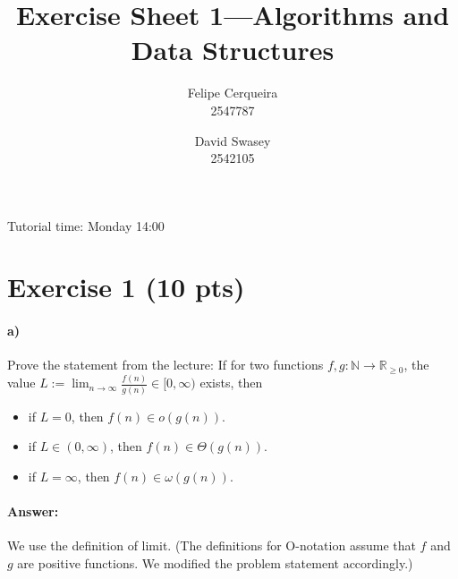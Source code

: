 \documentclass[a4paper]{article}
\title{Exercise Sheet 1---Algorithms and Data Structures}
\author{Felipe Cerqueira \\ 2547787 \and David Swasey \\ 2542105}
\newcommand{\RR}{\mathbb{R}}
\newcommand{\NN}{\mathbb{N}}
\newcommand{\RP}{\RR_{\ge 0}}
\begin{document}
\maketitle

Tutorial time: Monday 14:00

\section{Exercise 1 (10 pts)}

\paragraph{a)} Prove the statement from the lecture: If for two functions $f, g: \NN \to \RP$, the value $L := \lim_{n \to \infty} \frac{f(n)}{g(n)} \in [0, \infty)$ exists, then

\begin{itemize}
\item if $L = 0$, then $f(n) \in o(g(n))$.
\item if $L \in (0, \infty)$, then $f(n) \in \Theta(g(n))$.
\item if $L = \infty$, then $f(n) \in \omega(g(n))$.
\end{itemize}

\paragraph{Answer:}

We use the definition of limit.
(The definitions for O-notation assume that $f$ and $g$ are positive functions.
We modified the problem statement accordingly.)
\end{document}
